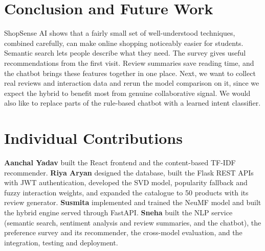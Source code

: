 \documentclass[conference]{IEEEtran}
\begin{document}
\section{Conclusion and Future Work}
ShopSense AI shows that a fairly small set of well-understood techniques, combined carefully, can make online shopping noticeably easier for students. Semantic search lets people describe what they need. The survey gives useful recommendations from the first visit. Review summaries save reading time, and the chatbot brings these features together in one place. Next, we want to collect real reviews and interaction data and rerun the model comparison on it, since we expect the hybrid to benefit most from genuine collaborative signal. We would also like to replace parts of the rule-based chatbot with a learned intent classifier.

\section*{Individual Contributions}
\textbf{Aanchal Yadav} built the React frontend and the content-based TF-IDF recommender. \textbf{Riya Aryan} designed the database, built the Flask REST APIs with JWT authentication, developed the SVD model, popularity fallback and fuzzy interaction weights, and expanded the catalogue to 50 products with its review generator. \textbf{Susmita} implemented and trained the NeuMF model and built the hybrid engine served through FastAPI. \textbf{Sneha} built the NLP service (semantic search, sentiment analysis and review summaries, and the chatbot), the preference survey and its recommender, the cross-model evaluation, and the integration, testing and deployment.
\end{document}
